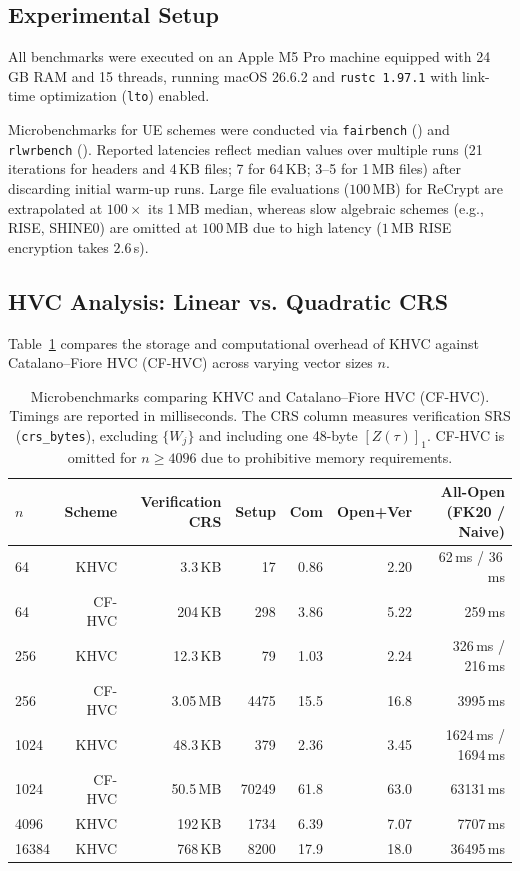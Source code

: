 \subsection{Experimental Setup}
\label{sec:eval_setup}

All benchmarks were executed on an Apple M5 Pro machine equipped with 24\,GB RAM and 15 threads, running macOS 26.6.2 and \texttt{rustc 1.97.1} with link-time optimization (\texttt{lto}) enabled.

Microbenchmarks for UE schemes were conducted via \texttt{fairbench} () and \texttt{rlwrbench} (). Reported latencies reflect median values over multiple runs (21 iterations for headers and 4\,KB files; 7 for 64\,KB; 3–5 for 1\,MB files) after discarding initial warm-up runs. Large file evaluations ($100$\,MB) for ReCrypt are extrapolated at $100\times$ its 1\,MB median, whereas slow algebraic schemes (e.g., RISE, SHINE0) are omitted at $100$\,MB due to high latency ($1$\,MB RISE encryption takes $2.6$\,s).

\subsection{HVC Analysis: Linear vs. Quadratic CRS}
\label{sec:eval_hvc}

Table~\ref{tab:hvc} compares the storage and computational overhead of KHVC against Catalano--Fiore HVC (CF-HVC) across varying vector sizes $n$.

\begin{table}[htbp]
\centering
\caption{Microbenchmarks comparing KHVC and Catalano--Fiore HVC (CF-HVC). Timings are reported in milliseconds. The CRS column measures verification SRS (\texttt{crs\_bytes}), excluding $\{W_j\}$ and including one 48-byte $[Z(\tau)]_1$. CF-HVC is omitted for $n \ge 4096$ due to prohibitive memory requirements.}
\label{tab:hvc}
\small
\begin{tabular}{@{}lrrrrrr@{}}
\toprule
$n$ & Scheme & Verification CRS & Setup & Com & Open+Ver & All-Open (FK20 / Naive) \\
\midrule
64    & KHVC   & 3.3\,KB   & 17     & 0.86 & 2.20  & 62\,ms / 36\,ms \\
64    & CF-HVC & 204\,KB   & 298    & 3.86 & 5.22  & 259\,ms \\
256   & KHVC   & 12.3\,KB  & 79     & 1.03 & 2.24  & 326\,ms / 216\,ms \\
256   & CF-HVC & 3.05\,MB  & 4475   & 15.5 & 16.8  & 3995\,ms \\
1024  & KHVC   & 48.3\,KB  & 379    & 2.36 & 3.45  & 1624\,ms / 1694\,ms \\
1024  & CF-HVC & 50.5\,MB  & 70249  & 61.8 & 63.0  & 63131\,ms \\
4096  & KHVC   & 192\,KB   & 1734   & 6.39 & 7.07  & 7707\,ms \\
16384 & KHVC   & 768\,KB   & 8200   & 17.9 & 18.0  & 36495\,ms \\
\bottomrule
\end{tabular}
\end{table}

